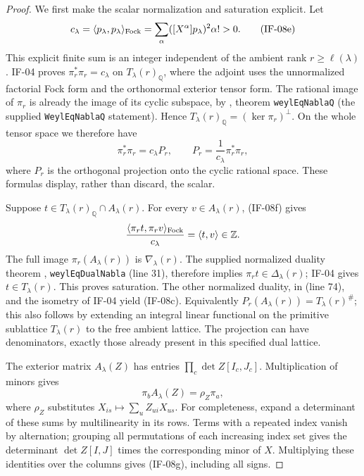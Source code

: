 \documentclass[11pt,a4paper]{article}
\theoremstyle{definition}
\theoremstyle{remark}
\begin{document}
\begin{proof}
We first make the scalar normalization and saturation explicit. Let
\[
 c_\lambda=\langle p_\lambda,p_\lambda\rangle_{\rm Fock}
   =\sum_\alpha ([X^\alpha]p_\lambda)^2\alpha!>0.
                                                               \tag{IF-08e}
\]
This explicit finite sum is an integer independent of the ambient rank $r\geq\ell(\lambda)$.
IF-04 proves $\pi_r^*\pi_r=c_\lambda$ on $T_\lambda(r)_\mathbb Q$,
where the adjoint uses the unnormalized factorial Fock form and the
orthonormal exterior tensor form. The rational image of $\pi_r$ is
already the image of its cyclic subspace, by
, theorem
\texttt{weylEqNablaQ} (the supplied \texttt{WeylEqNablaQ} statement).
Hence $T_\lambda(r)_\mathbb Q=(\ker\pi_r)^\perp$. On the whole tensor
space we therefore have
\[
 \pi_r^*\pi_r=c_\lambda P_r,\qquad
 P_r=\frac1{c_\lambda}\pi_r^*\pi_r,                 \tag{IF-08f}
\]
where $P_r$ is the orthogonal projection onto the cyclic rational
space. These formulas display, rather than discard, the scalar.

Suppose $t\in T_\lambda(r)_\mathbb Q\cap A_\lambda(r)$.
For every $v\in A_\lambda(r)$, (IF-08f) gives
\[
 \frac{\langle\pi_rt,\pi_rv\rangle_{\rm Fock}}{c_\lambda}
       =\langle t,v\rangle\in\mathbb Z.
\]
The full image $\pi_r(A_\lambda(r))$ is $\nabla_\lambda(r)$.
The supplied normalized duality theorem
,
\texttt{weylEqDualNabla} (line 31),
therefore implies $\pi_rt\in\Delta_\lambda(r)$; IF-04 gives
$t\in T_\lambda(r)$. This proves saturation. The other normalized
duality,  in
(line 74), and the isometry of IF-04 yield
(IF-08c). Equivalently $P_r(A_\lambda(r))=T_\lambda(r)^\#$;
this also follows by extending an integral linear functional on the
primitive sublattice $T_\lambda(r)$ to the free ambient lattice.
The projection can have denominators, exactly those already present
in this specified dual lattice.

The exterior matrix $A_\lambda(Z)$ has entries
$\prod_c\det Z[I_c,J_c]$. Multiplication of minors gives
\[
 \pi_b A_\lambda(Z)=\rho_Z\pi_a,                  \tag{IF-08g}
\]
where $\rho_Z$ substitutes $X_{is}\mapsto\sum_u Z_{ui}X_{us}$.
For completeness, expand a determinant of these sums by multilinearity
in its rows. Terms with a repeated index vanish by alternation; grouping
all permutations of each increasing index set gives the determinant
$\det Z[I,J]$ times the corresponding minor of $X$. Multiplying these
identities over the columns gives (IF-08g), including all signs.


\end{proof}
\end{document}
